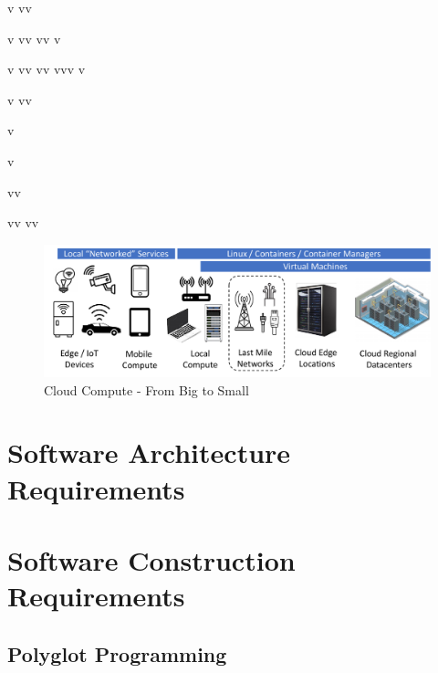 \documentclass[conference]{IEEEconf}
\begin{document}
v
vv

v
vv
vv
v

v
vv
vv
vvv
v

v
vv


v


v

vv

vv
vv



\begin{figure}[t!]
	\includegraphics[width=\textwidth]{images/CloudTopo2.pdf}	
	\caption{Cloud Compute - From Big to Small}
\end{figure}

\section{Software Architecture Requirements}
\label{sec:SoftwareArchitecture}

\section{Software Construction Requirements}
\label{sec:SoftwareConstruction}

\subsection{Polyglot Programming}
\label{subsec:Polyglot}




\end{document}
